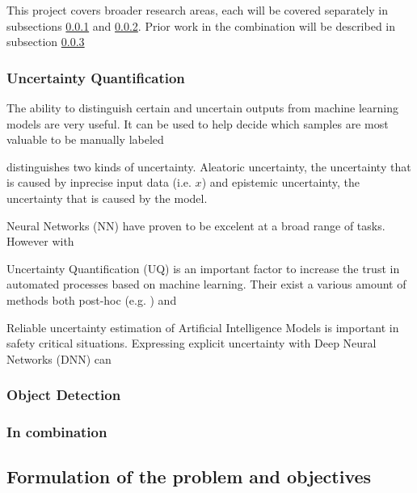 This project covers broader research areas, each will be covered separately in subsections \ref{sec:broadliterature:uncertainty} and \ref{sec:broadliterature:object_detection}. Prior work in the combination will be described in subsection \ref{sec:broadliterature:combination}

\subsubsection{Uncertainty Quantification}\label{sec:broadliterature:uncertainty}
The ability to distinguish certain and uncertain outputs from machine learning models are very useful. It can be used to help decide which samples are most valuable to be manually labeled 

\citep{gal2016uncertainty} distinguishes two kinds of uncertainty. Aleatoric uncertainty, the uncertainty that is caused by inprecise input data (i.e. $x$) and epistemic uncertainty, the uncertainty that is caused by the model.

Neural Networks (NN) have proven to be excelent at a broad range of tasks. However with

Uncertainty Quantification (UQ) is an important factor to increase the trust in automated processes based on machine learning. Their exist a various amount of methods both post-hoc (e.g. ) and



Reliable uncertainty estimation of Artificial Intelligence Models is important in safety critical situations. Expressing explicit uncertainty with Deep Neural Networks (DNN) can

\subsubsection{Object Detection}\label{sec:broadliterature:object_detection}


\subsubsection{In combination}\label{sec:broadliterature:combination}


\subsection{Formulation of the problem and objectives}

